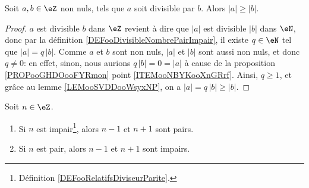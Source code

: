 \begin{proposition} \label{PROPooYJBMooZrzkNX}
	Soit \( a,b\in \eZ\) non nuls, tels que \( a\) soit divisible par \( b\). Alors \( | a |\geq | b |\).
\end{proposition}

\begin{proof}
	\( a\) est divisible \( b\) dans \( \eZ \) revient à dire que \( |a| \) est divisible \( |b| \) dans \( \eN \), donc par la définition \ref{DEFooDivisibleNombrePairImpair}, il existe \( q \in \eN \) tel que \( |a| = q\, |b| \). Comme \( a \) et \( b \) sont non nuls, \( |a| \) et \( |b| \) sont aussi non nuls, et donc \( q \neq 0 \): en effet, sinon, nous aurions \( q\, |b| = 0 = |a| \) à cause de la proposition \ref{PROPooGHDOooFYRmon} point \ref{ITEMooNBYKooXnGRrf}. Ainsi, \( q \geq 1 \), et grâce au lemme \ref{LEMooSVDDooWsyxNP}, on a \(|a| = q\, |b| \geq |b| \).
\end{proof}

\begin{lemma}	\label{LEMooCMOEooSoeclk}
	Soit \( n\in \eZ\).
	\begin{enumerate}
		\item
		      Si \( n\) est impair\footnote{Définition \ref{DEFooRelatifsDiviseurParite}.}, alors \( n-1\) et \( n+1\) sont pairs.
		\item
		      Si \( n\) est pair, alors \( n-1\) et \( n+1\) sont impairs.
	\end{enumerate}
\end{lemma}

